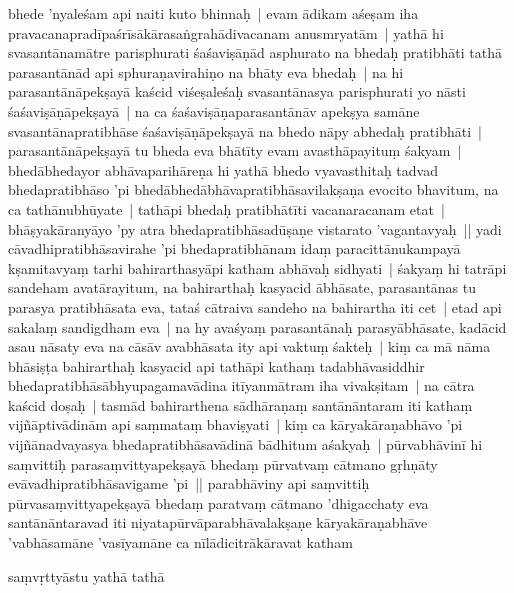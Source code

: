 \documentclass[article,12pt,a4paper]{memoir}%
\newcounter{parCount}
\begin{document}
	  \pstart \leavevmode%
	bhede 'nyaleśam api naiti kuto bhinnaḥ | evam ādikam aśeṣam iha pravacanapradīpaśrīsākārasaṅgrahādivacanam anusmryatām | \label{thakur75-147.21} yathā hi svasantānamātre parisphurati śaśaviṣāṇād asphurato na bhedaḥ pratibhāti tathā parasantānād api sphuraṇavirahiṇo na bhāty eva bhedaḥ | na hi parasantānāpekṣayā kaścid viśeṣaleśaḥ svasantānasya parisphurati yo nāsti śaśaviṣāṇāpekṣayā | na ca śaśaviṣāṇaparasantānāv apekṣya samāne svasantānapratibhāse śaśaviṣāṇāpekṣayā na bhedo nāpy abhedaḥ pratibhāti | parasantānāpekṣayā tu bheda eva bhātīty evam avasthāpayituṃ śakyam | \label{thakur75-147.27} bhedābhedayor abhāvaparihāreṇa hi yathā bhedo vyavasthitaḥ tadvad bhedapratibhāso 'pi bhedābhedābhāvapratibhāsavilakṣaṇa evocito bhavitum, na ca tathānubhūyate | tathāpi bhedaḥ pratibhātīti vacanaracanam etat | bhāṣyakāranyāyo 'py atra bhedapratibhāsadūṣaṇe vistarato 'vagantavyaḥ || \label{thakur75-148.1} yadi cāvadhipratibhāsavirahe 'pi bhedapratibhānam idaṃ paracittānukampayā kṣamitavyaṃ tarhi bahirarthasyāpi katham abhāvaḥ sidhyati | śakyaṃ hi tatrāpi sandeham avatārayitum, na bahirarthaḥ kasyacid ābhāsate, parasantānas tu parasya pratibhāsata eva, tataś cātraiva sandeho na bahirartha iti cet | etad api sakalaṃ sandigdham eva | na hy avaśyaṃ parasantānaḥ parasyābhāsate, kadācid asau nāsaty eva na cāsāv avabhāsata ity api vaktuṃ śakteḥ | \label{thakur75-148.7} kiṃ ca mā nāma bhāsiṣṭa bahirarthaḥ kasyacid api tathāpi kathaṃ tadabhāvasiddhir bhedapratibhāsābhyupagamavādina itīyanmātram iha vivakṣitam | na cātra kaścid doṣaḥ | tasmād bahirarthena sādhāraṇaṃ santānāntaram iti kathaṃ vijñāptivādinām api saṃmataṃ bhaviṣyati | kiṃ ca kāryakāraṇabhāvo 'pi vijñānadvayasya bhedapratibhāsavādinā bādhitum aśakyaḥ | pūrvabhāvinī hi saṃvittiḥ parasaṃvittyapekṣayā bhedaṃ pūrvatvaṃ cātmano gṛhṇāty evāvadhipratibhāsavigame 'pi || \label{thakur75-148.13} parabhāviny api saṃvittiḥ pūrvasaṃvittyapekṣayā bhedaṃ paratvaṃ cātmano 'dhigacchaty eva santānāntaravad iti niyatapūrvāparabhāvalakṣaṇe kāryakāraṇabhāve 'vabhāsamāne 'vasīyamāne ca nīlādicitrākāravat katham
	{}
	\pend%
      

	  \pstart \leavevmode%
	saṃvṛttyāstu yathā tathā 
	{}
	\pend%
      
\end{document}
